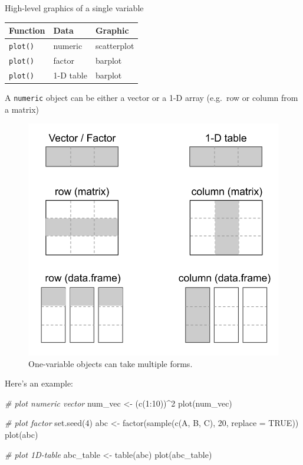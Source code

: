\documentclass[
]{book}
\newenvironment{Shaded}{\begin{snugshade}}{\end{snugshade}}
\newcommand{\AttributeTok}[1]{\textcolor[rgb]{0.77,0.63,0.00}{#1}}
\newcommand{\CommentTok}[1]{\textcolor[rgb]{0.56,0.35,0.01}{\textit{#1}}}
\newcommand{\ConstantTok}[1]{\textcolor[rgb]{0.00,0.00,0.00}{#1}}
\newcommand{\DecValTok}[1]{\textcolor[rgb]{0.00,0.00,0.81}{#1}}
\newcommand{\FunctionTok}[1]{\textcolor[rgb]{0.00,0.00,0.00}{#1}}
\newcommand{\NormalTok}[1]{#1}
\newcommand{\OtherTok}[1]{\textcolor[rgb]{0.56,0.35,0.01}{#1}}
\newcommand{\SpecialCharTok}[1]{\textcolor[rgb]{0.00,0.00,0.00}{#1}}
\newcommand{\StringTok}[1]{\textcolor[rgb]{0.31,0.60,0.02}{#1}}
\begin{document}
High-level graphics of a single variable

\begin{longtable}[]{@{}lll@{}}
\toprule()
Function & Data & Graphic \\
\midrule()
\endhead
\texttt{plot()} & numeric & scatterplot \\
\texttt{plot()} & factor & barplot \\
\texttt{plot()} & 1-D table & barplot \\
\bottomrule()
\end{longtable}

A \texttt{numeric} object can be either a vector or a 1-D array (e.g.~row or column
from a matrix)

\begin{figure}

{\centering \includegraphics[width=0.5\linewidth]{images/plots/one_variable_objs} 

}

\caption{One-variable objects can take multiple forms.}\label{fig:unnamed-chunk-212}
\end{figure}

Here's an example:

\begin{Shaded}
\begin{Highlighting}[]
\CommentTok{\# plot numeric vector}
\NormalTok{num\_vec }\OtherTok{\textless{}{-}}\NormalTok{ (}\FunctionTok{c}\NormalTok{(}\DecValTok{1}\SpecialCharTok{:}\DecValTok{10}\NormalTok{))}\SpecialCharTok{\^{}}\DecValTok{2}
\FunctionTok{plot}\NormalTok{(num\_vec)}

\CommentTok{\# plot factor}
\FunctionTok{set.seed}\NormalTok{(}\DecValTok{4}\NormalTok{)}
\NormalTok{abc }\OtherTok{\textless{}{-}} \FunctionTok{factor}\NormalTok{(}\FunctionTok{sample}\NormalTok{(}\FunctionTok{c}\NormalTok{(}\StringTok{\textquotesingle{}A\textquotesingle{}}\NormalTok{, }\StringTok{\textquotesingle{}B\textquotesingle{}}\NormalTok{, }\StringTok{\textquotesingle{}C\textquotesingle{}}\NormalTok{), }\DecValTok{20}\NormalTok{, }\AttributeTok{replace =} \ConstantTok{TRUE}\NormalTok{))}
\FunctionTok{plot}\NormalTok{(abc)}

\CommentTok{\# plot 1D{-}table}
\NormalTok{abc\_table }\OtherTok{\textless{}{-}} \FunctionTok{table}\NormalTok{(abc)}
\FunctionTok{plot}\NormalTok{(abc\_table)}
\end{Highlighting}
\end{Shaded}
\end{document}
